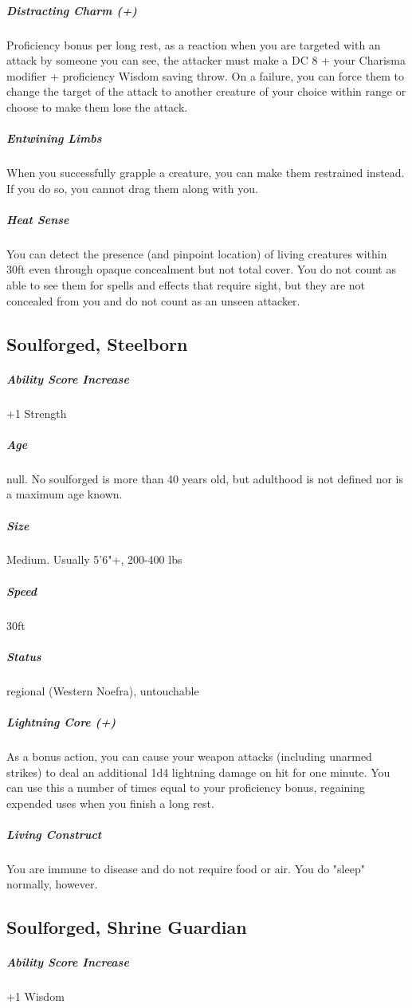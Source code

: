 \subparagraph*{Distracting Charm (+)}  Proficiency bonus per long rest, as a reaction when you are targeted with an attack by someone you can see, the attacker must make a DC 8 + your Charisma modifier + proficiency Wisdom saving throw. On a failure, you can force them to change the target of the attack to another creature of your choice within range or choose to make them lose the attack.

\subparagraph*{Entwining Limbs}  When you successfully grapple a creature, you can make them restrained instead. If you do so, you cannot drag them along with you.

\subparagraph*{Heat Sense}  You can detect the presence (and pinpoint location) of living creatures within 30ft even through opaque concealment but not total cover. You do not count as able to see them for spells and effects that require sight, but they are not concealed from you and do not count as an unseen attacker.

\subsection{Soulforged, Steelborn} \label{lineage:steelborn}

\subparagraph*{Ability Score Increase}  +1 Strength

\subparagraph*{Age}  null. No soulforged is more than 40 years old, but adulthood is not defined nor is a maximum age known.

\subparagraph*{Size}  Medium. Usually 5'6"+, 200-400 lbs

\subparagraph*{Speed}  30ft
\subparagraph*{Status}  regional (Western Noefra), untouchable

\subparagraph*{Lightning Core (+)}  As a bonus action, you can cause your weapon attacks (including unarmed strikes) to deal an additional 1d4 lightning damage on hit for one minute. You can use this a number of times equal to your proficiency bonus, regaining expended uses when you finish a long rest.

\subparagraph*{Living Construct}  You are immune to disease and do not require food or air. You do "sleep" normally, however.

\subsection{Soulforged, Shrine Guardian} \label{lineage:shrine-guardian}

\subparagraph*{Ability Score Increase}  +1 Wisdom


